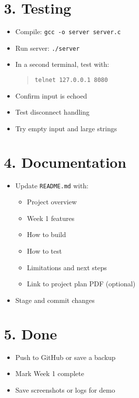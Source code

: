 \documentclass{article}
\begin{document}
\section*{3. Testing}
\begin{itemize}[label=--]
    \item Compile: \texttt{gcc -o server server.c}
    \item Run server: \texttt{./server}
    \item In a second terminal, test with:
    \begin{quote}
        \texttt{telnet 127.0.0.1 8080}
    \end{quote}
    \item Confirm input is echoed
    \item Test disconnect handling
    \item Try empty input and large strings
\end{itemize}

\section*{4. Documentation}
\begin{itemize}[label=--]
    \item Update \texttt{README.md} with:
    \begin{itemize}
        \item Project overview
        \item Week 1 features
        \item How to build
        \item How to test
        \item Limitations and next steps
        \item Link to project plan PDF (optional)
    \end{itemize}
    \item Stage and commit changes
\end{itemize}

\section*{5. Done}
\begin{itemize}[label=--]
    \item Push to GitHub or save a backup
    \item Mark Week 1 complete
    \item Save screenshots or logs for demo
\end{itemize}
\end{document}
